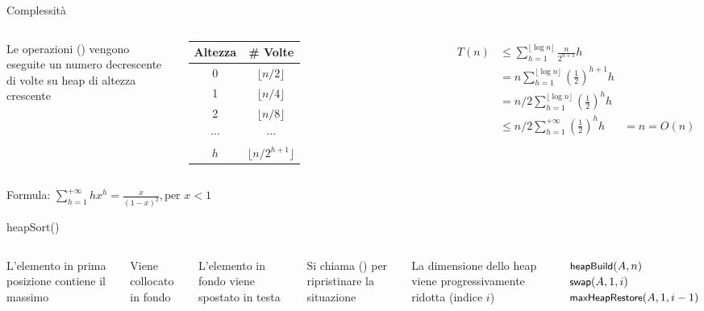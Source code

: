 \begin{frame}{Complessità}
    
\vspace{-6pt}
\begin{columns}[T]
Le operazioni \maxheapify() vengono eseguite un numero
decrescente di volte su heap di altezza crescente

\medskip
\begin{tabular}{|c|c|}
\hline
\textbf{Altezza} & \textbf{\# Volte} \\\hline
0 & $\lfloor n/2\rfloor$ \\\hline
1 & $\lfloor n/4\rfloor$ \\\hline
2 & $\lfloor n/8\rfloor$ \\\hline
$\cdots$ & $\cdots$ \\\hline
$h$ & $\lfloor n/2^{h+1}\rfloor$ \\\hline
\end{tabular}
\begin{align*}
T(n) &\leq \sum_{h=1}^{\lfloor \log n \rfloor} \frac{n}{2^{h+1}}h \\
     &= n\sum_{h=1}^{\lfloor \log n \rfloor} \left(\frac{1}{2}\right)^{h+1}h \\
     &= n/2 \sum_{h=1}^{\lfloor \log n \rfloor} \left(\frac{1}{2}\right)^{h}h \\
     &\leq n/2 \sum_{h=1}^{+\infty} \left(\frac{1}{2}\right)^{h}h 
     & = n = O(n)\\
\end{align*}
\end{columns}

\vspace{-12pt}
Formula: $\displaystyle \sum_{h=1}^{+\infty} hx^h = \frac{x}{(1-x)^2}, \textrm{per $x<1$}$

\end{frame}

\begin{frame}{heapSort()}

\vspace{-6pt}
\begin{columns}[T]
\vspace{-6pt}
\small
\BIL
\item L'elemento in prima posizione contiene il massimo
\item Viene collocato in fondo
\item L'elemento in fondo viene spostato in testa
\item Si chiama \maxheapify() per ripristinare la situazione
\item La dimensione dello heap viene progressivamente ridotta 
(indice $i$)
\EIL
{}
\vspace{-9pt}
\begin{Procedure}
\caption[A]{\textsc{heapSort}($\Item[\,]\ A$, \INTEGER $n$)}
$\textsf{{\small heapBuild}}(A, n)$\;
{
  $\textsf{{\small swap}}(A,1,i)$\;
  $\textsf{{\small maxHeapRestore}}(A, 1, i-1)$\;
}
\end{Procedure}
\end{columns}
\end{frame}

